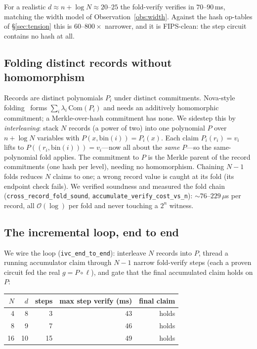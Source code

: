 \documentclass[11pt]{article}
\newcommand{\bigO}{\mathcal{O}}
\begin{document}
For a realistic $d\approx n+\log N\approx20$--$25$ the fold-verify verifies in
$70$--$90$\,ms, matching the width model of Observation~\ref{obs:width}. Against
the hash op-tables of \S\ref{sec:tension} this is $60$--$800\times$ narrower, and
it is FIPS-clean: the step circuit contains no hash at all.

\subsection{Folding distinct records without homomorphism}

Records are distinct polynomials $P_i$ under distinct commitments. Nova-style
folding~\cite{nova} forms $\sum_i \lambda_i\,\mathrm{Com}(P_i)$ and needs an
additively homomorphic commitment; a Merkle-over-hash commitment has none. We sidestep this
by \emph{interleaving}: stack $N$ records (a power of two) into one polynomial $P$
over $n+\log N$ variables with $P(x,\mathrm{bin}(i))=P_i(x)$. Each claim
$P_i(r_i)=v_i$ lifts to $P((r_i,\mathrm{bin}(i)))=v_i$---now all about the
\emph{same} $P$---so the same-polynomial fold applies. The commitment to $P$ is
the Merkle parent of the record commitments (one hash per level), needing no
homomorphism. Chaining $N-1$ folds reduces $N$ claims to one; a wrong record
value is caught at its fold (its endpoint check fails). We verified soundness and
measured the fold chain (\texttt{cross\_record\_fold\_sound},
\texttt{accumulate\_verify\_cost\_vs\_n}): $\sim76$--$229$\,$\mu$s per record, all
$\bigO(\log)$ per fold and never touching a $2^n$ witness.

\subsection{The incremental loop, end to end}

We wire the loop (\texttt{ivc\_end\_to\_end}): interleave $N$ records into $P$,
thread a running accumulator claim through $N-1$ narrow fold-verify steps (each a
proven circuit fed the real $g=P\circ\ell$), and gate that the final accumulated
claim holds on $P$:

\begin{center}
\begin{tabular}{rrrrr}
\toprule
$N$ & $d$ & steps & max step verify (ms) & final claim\\
\midrule
4  & 8  & 3  & 43 & holds\\
8  & 9  & 7  & 46 & holds\\
16 & 10 & 15 & 49 & holds\\
\bottomrule
\end{tabular}
\end{center}
\end{document}
